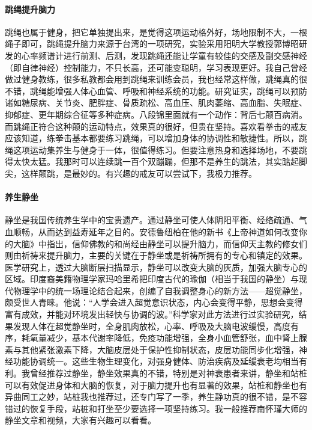 \paragraph{跳绳提升脑力} 跳绳也属于健身，把它单独提出来，是觉得这项运动格外好，场地限制不大，一根绳子即可，跳绳提升脑力来源于台湾的一项研究，实验采用阳明大学教授郭博昭研发的心率频谱计进行前测、后测，发现跳绳还能让学童有较佳的交感及副交感神经（即自律神经）控制能力，不只长高，还可能变聪明，学习表现更好。我自己曾经做过健身教练，很多私教都会用到跳绳来训练会员，我也经常这样做，跳绳真的很不错，跳绳能增强人体心血管、呼吸和神经系统的功能。研究证实，跳绳可以预防诸如糖尿病、关节炎、肥胖症、骨质疏松、高血压、肌肉萎缩、高血脂、失眠症、抑郁症、更年期综合征等多种症病。八段锦里面就有一个动作：背后七颠百病消。而跳绳正符合这种颠的运动特点，效果真的很好，但贵在坚持。喜欢看拳击的戒友应该知道，练拳击基本都要练习跳绳，可以增加身体的协调性和敏捷性。所以，跳绳这项运动集养生与健身于一体，很值得练习。但要注意热身和选择场地，不要跳得太快太猛。我那时可以连续跳一百个双蹦蹦，但那不是养生的跳法，其实踮起脚尖，这样颠跳，是最妙的。有兴趣的戒友可以尝试下，我极力推荐。

\paragraph{养生静坐} 静坐是我国传统养生学中的宝贵遗产。通过静坐可使人体阴阳平衡、经络疏通、气血顺畅，从而达到益寿延年之目的。安德鲁纽柏在他的新书《上帝神道如何改变你的大脑》中指出，信仰佛教的和尚经由静坐可以提升脑力，而信仰天主教的修女们则由祈祷来提升脑力，主要的关键在于静坐或是祈祷所拥有的专心和镇定的效果。医学研究上，透过大脑断层扫描显示，静坐可以改变大脑的灰质，加强大脑专心的区域。印度裔美籍物理学家玛哈里希把印度古代的瑜伽（相当于我国的静坐）与现代物理学中的统一场理论结合起来，创编了自我调整身心的新方法——超觉静坐，颇受世人青睐。他说：“人学会进入超觉意识状态，内心会变得平静，思想会变得富有成效，并能对环境发出轻快与协调的波。”科学家对此方法进行过实验研究，结果发现人体在超觉静坐时，全身肌肉放松，心率、呼吸及大脑电波缓慢，高度有序，耗氧量减少，基本代谢率降低，免疫功能增强，全身小血管舒张，血中肾上腺素与其他紧张激素下降，大脑皮层处于保护性抑制状态，皮层功能同步化增强，神经功能协调统一。这些生物生理变化，对强身健体、防治疾病及延缓衰老均相当有利。我曾经推荐过静坐，静坐效果真的不错，特别是对神衰患者来讲，静坐和站桩可以有效促进身体和大脑的恢复，对于脑力提升也有显著的效果，站桩和静坐也有异曲同工之妙，站桩我也推荐过，还专门写了一季，养生静功真的很不错，是不容错过的恢复手段，站桩和打坐至少要选择一项坚持练习。我一般推荐南怀瑾大师的静坐文章和视频，大家有兴趣可以看看。


